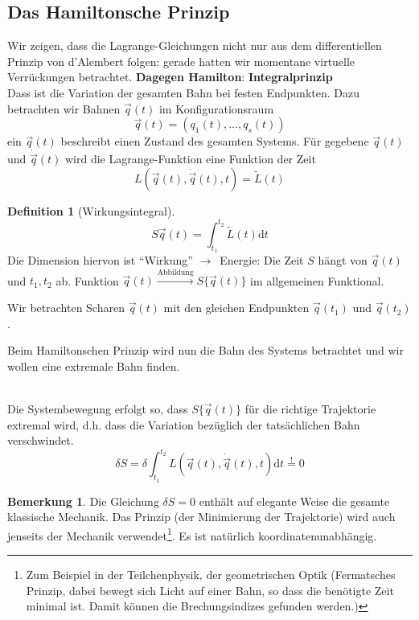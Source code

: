 \documentclass[oneside]{book}
\theoremstyle{definition}
\newtheorem*{definition*}{Definition}
\newtheorem*{bemerkung*}{Bemerkung}
\newcommand{\conseq}{$\rightarrow$~}
\renewcommand{\d}{\mathrm d}
\newcommand{\dotvec}[1]{\dot{\vec{#1}}}
\begin{document}
\subsection{Das Hamiltonsche Prinzip}	
Wir zeigen, dass die Lagrange-Gleichungen nicht nur aus dem differentiellen Prinzip von d'Alembert folgen: gerade hatten wir momentane virtuelle Verrückungen betrachtet.
\textbf{Dagegen Hamilton}: \textbf{Integralprinzip}\\
Dass ist die Variation der gesamten Bahn bei festen Endpunkten.
Dazu betrachten wir Bahnen $\vec{q}(t)$ im Konfigurationsraum
$$\vec{q}(t) = (q_1(t), \dots, q_s(t))$$
ein $\vec{q}(t)$ beschreibt einen Zustand des gesamten Systems. Für gegebene $\vec{q}(t)$ und $\dot{\vec{q}}(t)$ wird die Lagrange-Funktion eine Funktion der Zeit 
$$L(\vec{q}(t), \dotvec{q}(t), t) = \tilde{L}(t)$$

\begin{definition*}[Wirkungsintegral]
$$S{ \vec{q}(t) } = \int_{t_1}^{t_2} \tilde{L}(t) \d t$$
Die Dimension hiervon ist "`Wirkung"' \conseq Energie: Die Zeit
$S$ hängt von $\vec{q}(t)$ und $t_1, t_2$ ab. 
Funktion $\vec{q}(t) \xrightarrow{\text{Abbildung}} S \{ \vec{q}(t) \}$ im allgemeinen Funktional.

Wir betrachten Scharen $\vec{q}(t)$ mit den gleichen Endpunkten $\vec{q}(t_1)$ und $\vec{q}(t_2)$.	
\end{definition*}


Beim Hamiltonschen Prinzip wird nun die Bahn des Systems betrachtet und wir wollen eine extremale Bahn finden.

~\\
Die Systembewegung erfolgt so, dass $S\{\vec{q}(t)\}$ für die richtige Trajektorie extremal wird, d.h. dass die Variation bezüglich der tatsächlichen Bahn verschwindet.
$$\delta S = \delta \int_{t_1}^{t_2} L(\vec{q}(t), \dotvec{q}(t), t) \d t \overset{!}{=} 0$$

\begin{bemerkung*}
	Die Gleichung $\delta S = 0$ enthält auf elegante Weise die gesamte klassische Mechanik. Das Prinzip (der Minimierung der Trajektorie) wird auch jenseits der Mechanik verwendet\footnote{Zum Beispiel in der Teilchenphysik, der geometrischen Optik (Fermatsches Prinzip, dabei bewegt sich Licht auf einer Bahn, so dass die benötigte Zeit minimal ist. Damit können die Brechungsindizes gefunden werden.)}. Es ist natürlich koordinatenunabhängig.
\end{bemerkung*}
\end{document}
